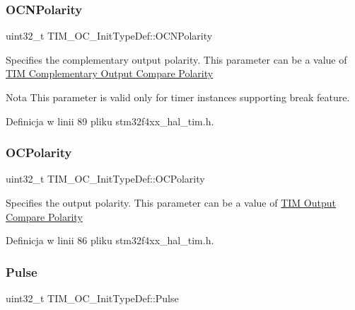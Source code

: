 \subsubsection{\texorpdfstring{O\+C\+N\+Polarity}{OCNPolarity}}
{\footnotesize\ttfamily uint32\+\_\+t T\+I\+M\+\_\+\+O\+C\+\_\+\+Init\+Type\+Def\+::\+O\+C\+N\+Polarity}

Specifies the complementary output polarity. This parameter can be a value of \hyperlink{group___t_i_m___output___compare___n___polarity}{T\+IM Complementary Output Compare Polarity} \begin{DoxyNote}{Nota}
This parameter is valid only for timer instances supporting break feature. 
\end{DoxyNote}


Definicja w linii 89 pliku stm32f4xx\+\_\+hal\+\_\+tim.\+h.

\mbox{\label{struct_t_i_m___o_c___init_type_def_a556b7137d041aceed3e45c87cbfb39cd}} 
\subsubsection{\texorpdfstring{O\+C\+Polarity}{OCPolarity}}
{\footnotesize\ttfamily uint32\+\_\+t T\+I\+M\+\_\+\+O\+C\+\_\+\+Init\+Type\+Def\+::\+O\+C\+Polarity}

Specifies the output polarity. This parameter can be a value of \hyperlink{group___t_i_m___output___compare___polarity}{T\+IM Output Compare Polarity} 

Definicja w linii 86 pliku stm32f4xx\+\_\+hal\+\_\+tim.\+h.

\mbox{\label{struct_t_i_m___o_c___init_type_def_a61fb5b9ef4154de67620ac81085a0e39}} 
\subsubsection{\texorpdfstring{Pulse}{Pulse}}
{\footnotesize\ttfamily uint32\+\_\+t T\+I\+M\+\_\+\+O\+C\+\_\+\+Init\+Type\+Def\+::\+Pulse}


